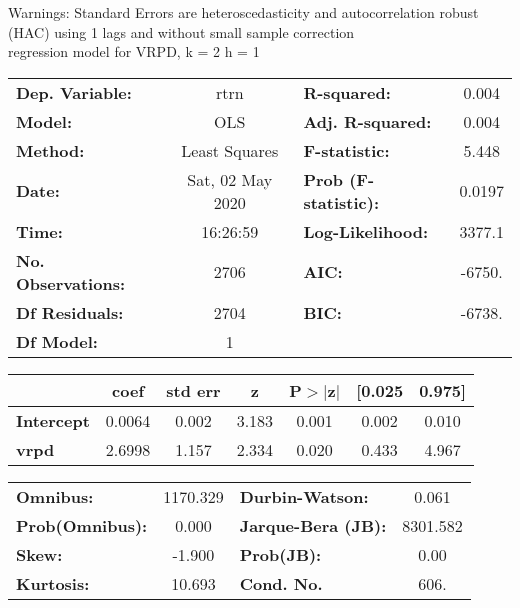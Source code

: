 Warnings: \newline
 [1] Standard Errors are heteroscedasticity and autocorrelation robust (HAC) using 1 lags and without small sample correction\\ 

regression model for VRPD, k = 2 h = 1\begin{center}
\begin{tabular}{lclc}
\toprule
\textbf{Dep. Variable:}    &       rtrn       & \textbf{  R-squared:         } &     0.004   \\
\textbf{Model:}            &       OLS        & \textbf{  Adj. R-squared:    } &     0.004   \\
\textbf{Method:}           &  Least Squares   & \textbf{  F-statistic:       } &     5.448   \\
\textbf{Date:}             & Sat, 02 May 2020 & \textbf{  Prob (F-statistic):} &   0.0197    \\
\textbf{Time:}             &     16:26:59     & \textbf{  Log-Likelihood:    } &    3377.1   \\
\textbf{No. Observations:} &        2706      & \textbf{  AIC:               } &    -6750.   \\
\textbf{Df Residuals:}     &        2704      & \textbf{  BIC:               } &    -6738.   \\
\textbf{Df Model:}         &           1      & \textbf{                     } &             \\
\bottomrule
\end{tabular}
\begin{tabular}{lcccccc}
                   & \textbf{coef} & \textbf{std err} & \textbf{z} & \textbf{P$> |$z$|$} & \textbf{[0.025} & \textbf{0.975]}  \\
\midrule
\textbf{Intercept} &       0.0064  &        0.002     &     3.183  &         0.001        &        0.002    &        0.010     \\
\textbf{vrpd}      &       2.6998  &        1.157     &     2.334  &         0.020        &        0.433    &        4.967     \\
\bottomrule
\end{tabular}
\begin{tabular}{lclc}
\textbf{Omnibus:}       & 1170.329 & \textbf{  Durbin-Watson:     } &    0.061  \\
\textbf{Prob(Omnibus):} &   0.000  & \textbf{  Jarque-Bera (JB):  } & 8301.582  \\
\textbf{Skew:}          &  -1.900  & \textbf{  Prob(JB):          } &     0.00  \\
\textbf{Kurtosis:}      &  10.693  & \textbf{  Cond. No.          } &     606.  \\
\bottomrule
\end{tabular}
\end{center}

